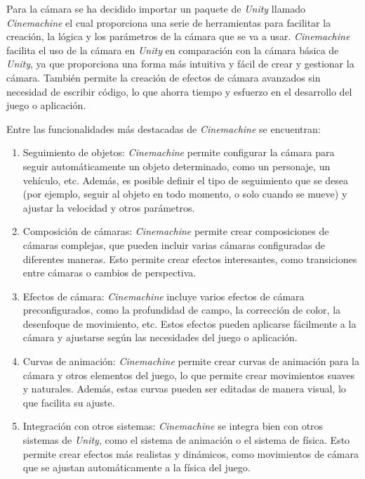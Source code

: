 Para la cámara se ha decidido importar un paquete de \textit{Unity} llamado \textit{Cinemachine} \cite{UnityCinemachine} %
el cual proporciona una serie de herramientas para facilitar la creación, la lógica y los parámetros de la cámara 
que se va a usar.
\textit{Cinemachine} facilita el uso de la cámara en \textit{Unity} en comparación con la cámara básica de \textit{Unity}, ya que proporciona una forma más intuitiva y fácil de crear y gestionar la cámara. También permite la creación de efectos de cámara avanzados sin necesidad de escribir código, lo que ahorra tiempo y esfuerzo en el desarrollo del juego o aplicación.

Entre las funcionalidades más destacadas de \textit{Cinemachine} se encuentran:

\begin{enumerate}
\item Seguimiento de objetos: \textit{Cinemachine} permite configurar la cámara para seguir automáticamente un objeto determinado, como un personaje, un vehículo, etc. Además, es posible definir el tipo de seguimiento que se desea (por ejemplo, seguir al objeto en todo momento, o solo cuando se mueve) y ajustar la velocidad y otros parámetros.

\item Composición de cámaras: \textit{Cinemachine} permite crear composiciones de cámaras complejas, que pueden incluir varias cámaras configuradas de diferentes maneras. Esto permite crear efectos interesantes, como transiciones entre cámaras o cambios de perspectiva.

\item Efectos de cámara: \textit{Cinemachine} incluye varios efectos de cámara preconfigurados, como la profundidad de campo, la corrección de color, la desenfoque de movimiento, etc. Estos efectos pueden aplicarse fácilmente a la cámara y ajustarse según las necesidades del juego o aplicación.

\item Curvas de animación: \textit{Cinemachine} permite crear curvas de animación para la cámara y otros elementos del juego, lo que permite crear movimientos suaves y naturales. Además, estas curvas pueden ser editadas de manera visual, lo que facilita su ajuste.

\item Integración con otros sistemas: \textit{Cinemachine} se integra bien con otros sistemas de \textit{Unity}, como el sistema de animación o el sistema de física. Esto permite crear efectos más realistas y dinámicos, como movimientos de cámara que se ajustan automáticamente a la física del juego.

\end{enumerate}

